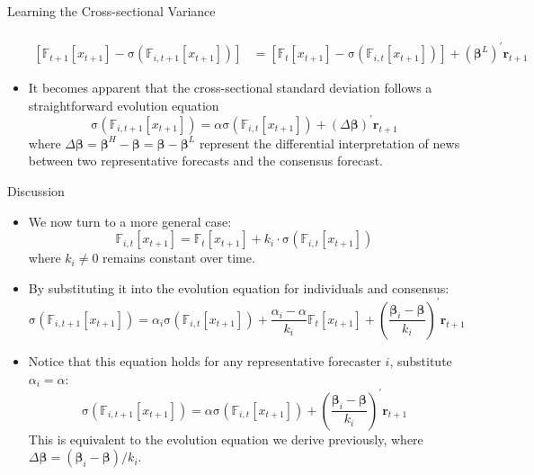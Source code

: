 \documentclass[UTF8, 10pt]{beamer}
\begin{document}
\begin{CJK*}{UTF8}{gbsn}
\begin{frame}{Learning the Cross-sectional Variance}
\begin{itemize}
$$\begin{aligned}
		        \\
		        \left[
		        \mathbb{F}_{t+1}\left[x_{t+1}\right] - \mathrm{\sigma}\left(\mathbb{F}_{i, t+1}\left[x_{t+1}\right]\right)
		        \right]
		        & = 
		        \left[
		        \mathbb{F}_{t}\left[x_{t+1}\right] - \mathrm{\sigma}\left(\mathbb{F}_{i, t}\left[x_{t+1}\right]\right)
		        \right]
		        + (\boldsymbol{\beta}^L)^{\prime}\mathbf{r}_{t+1}
		    \end{aligned}
			$$
		\item It becomes apparent that the cross-sectional standard deviation follows a straightforward evolution equation
			$$
			\mathrm{\sigma}\left(\mathbb{F}_{i, t+1}\left[x_{t+1}\right]\right)
    		= 
		    \alpha \mathrm{\sigma}\left(\mathbb{F}_{i, t}\left[x_{t+1}\right]\right)
		    + (\Delta\boldsymbol{\beta})^{\prime}\mathbf{r}_{t+1}
			$$
			where $\Delta \boldsymbol{\beta} = \boldsymbol{\beta}^H - \boldsymbol{\beta} = \boldsymbol{\beta} - \boldsymbol{\beta}^L$ represent the \alert{differential interpretation of news} between two representative forecasts and the consensus forecast.
	\end{itemize}
\end{frame}
\begin{frame}{Discussion}
	\begin{itemize}
		\item We now turn to a more general case:
			$$
		        \mathbb{F}_{i, t}\left[x_{t+1}\right]
		        = \mathbb{F}_{t}\left[x_{t+1}\right] + k_i\cdot \mathrm{\sigma}\left(\mathbb{F}_{i, t}\left[x_{t+1}\right]\right)
			$$
			where $k_i\neq 0$ \alert{remains constant over time}.
		\item By substituting it into the evolution equation for individuals and consensus:
			$$
			\mathrm{\sigma}\left(\mathbb{F}_{i, t+1}\left[x_{t+1}\right]\right)
	        =\alpha_i \mathrm{\sigma}\left(\mathbb{F}_{i, t}\left[x_{t+1}\right]\right)
	        +\frac{\alpha_i-\alpha}{k_i}\mathbb{F}_{t}\left[x_{t+1}\right]
	        +(\frac{\boldsymbol{\beta}_i-\boldsymbol{\beta}}{k_i})^\prime \mathbf{r}_{t+1}
			$$
		\item Notice that this equation holds for any representative forecaster $i$, substitute $\alpha_i=\alpha$:
			$$
			\mathrm{\sigma}\left(\mathbb{F}_{i, t+1}\left[x_{t+1}\right]\right)
	        =\alpha \mathrm{\sigma}\left(\mathbb{F}_{i, t}\left[x_{t+1}\right]\right)
	        +(\frac{\boldsymbol{\beta}_i-\boldsymbol{\beta}}{k_i})^\prime \mathbf{r}_{t+1}
			$$
			This is equivalent to the evolution equation we derive previously, where $\Delta\boldsymbol{\beta}=(\boldsymbol{\beta}_i-\boldsymbol{\beta})/k_i$.

\end{itemize}
\end{frame}
\end{CJK*}
\end{document}
